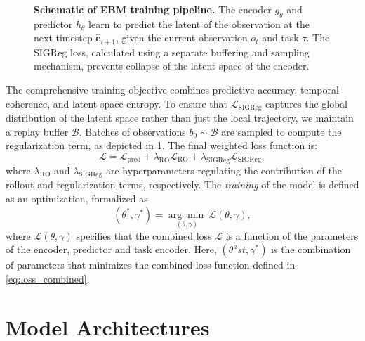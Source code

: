 \begin{figure}
	\begin{center}
		
	\end{center}
	\caption{\textbf{Schematic of EBM training pipeline.} The encoder $g_\theta$ and predictor $h_\theta$ learn to predict the latent of the observation at the next timestep $\hat{\mathbf{e}}_{t+1}$, given the current observation $o_t$ and task $\tau$. The SIGReg loss, calculated using a separate buffering and sampling mechanism, prevents collapse of the latent space of the encoder.}\label{fig:architecture}
\end{figure}

The comprehensive training objective combines predictive accuracy, temporal coherence, and latent space entropy. To ensure that \( \mathcal{L}_\mathrm{SIGReg} \) captures the global distribution of the latent space rather than just the local trajectory, we maintain a replay buffer \( \mathcal{B} \). Batches of observations \( b_0 \sim \mathcal{B} \) are sampled to compute the regularization term, as depicted in \cref{fig:architecture}. The final weighted loss function is:
\begin{equation}
	\mathcal{L} = \mathcal{L}_\mathrm{pred}
	+ \lambda_\mathrm{RO} \mathcal{L}_\mathrm{RO}
	+ \lambda_\mathrm{SIGReg} \mathcal{L}_\mathrm{SIGReg} ,
	\label{eq:loss_combined}
\end{equation}
where \( \lambda_\mathrm{RO} \) and \( \lambda_\mathrm{SIGReg} \) are hyperparameters regulating the contribution of the rollout and regularization terms, respectively. The \textit{training} of the model is defined as an optimization, formalized as
\begin{equation}
	(\theta^\ast, \gamma^\ast) = \underset{(\theta, \gamma)}{\arg \min\ }{\mathcal{L}(\theta, \gamma)} ,
	\label{eq:training_optimization}
\end{equation}
where \( \mathcal{L}(\theta, \gamma) \) specifies that the combined loss \( \mathcal{L} \) is a function of the parameters of the encoder, predictor and task encoder. Here, \( (\theta^ast, \gamma^\ast) \) is the combination of parameters that minimizes the combined loss function defined in \cref{eq:loss_combined}.


\section{Model Architectures}
\label{sec:model_architectures}

